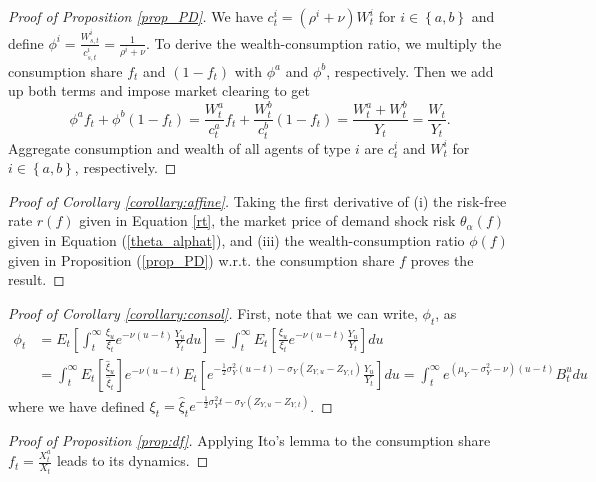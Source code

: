 \documentclass[preprint,11pt,authoryear]{elsarticle}
\theoremstyle{plain}
\begin{document}
\begin{proof}[Proof of Proposition \ref{prop_PD}]
We have $c^i_t = \left(\rho^i + \nu\right) W^i_t$ for $i \in \left\{a,b\right\}$ and define $\phi^i = \frac{W^i_{s,t}}{c^i_{s,t}} = \frac{1}{\rho^i + \nu}$. To derive the wealth-consumption ratio, we multiply the consumption share $f_{t}$ and $(1-f_t)$ with $\phi^{a}$ and $\phi^{b}$, respectively. Then we add up both terms and impose market clearing to get
\begin{equation}
    \phi^{a} f_t + \phi^{b}\left(1-f_t\right) = \frac{W^a_t}{c^a_t}f_t + \frac{W^b_t}{c^b_t}\left(1-f_t\right) = \frac{W^a_t + W^b_t}{Y_t} = \frac{W_t}{Y_t}.
\end{equation}
Aggregate consumption and wealth of all agents of type $i$ are $c^i_t$ and $W^i_t$ for $i \in \left\{a,b\right\}$, respectively.
\end{proof}
\begin{proof}[Proof of Corollary \ref{corollary:affine}]
Taking the first derivative of (i) the risk-free rate $r(f)$ given in Equation \ref{rt}, the market price of demand shock risk $\theta_{\alpha}(f)$ given in Equation (\ref{theta_alphat}), and (iii) the wealth-consumption ratio $\phi(f)$ given in Proposition (\ref{prop_PD}) w.r.t. the consumption share $f$ proves the result. 
\end{proof}
\begin{proof}[Proof of Corollary \ref{corollary:consol}]
First, note that we can write, $\phi_t$, as 
\begin{equation}
    \begin{split}
    \phi_t &=  E_t\left[\int_{t}^{\infty} \frac{\xi_{u}}{\xi_t}e^{-\nu\left(u-t\right)}\frac{Y_u}{Y_t}du\right]  
     =  \int_{t}^{\infty} E_t\left[\frac{\xi_{u}}{\xi_t}e^{-\nu\left(u-t\right)}\frac{Y_u}{Y_t}\right]du \\
    &=  \int_{t}^{\infty} E_t\left[\frac{\hat{\xi}_{u}}{\hat{\xi}_t}\right]e^{-\nu\left(u-t\right)}E_t\left[e^{-\frac{1}{2}\sigma_Y^2\left(u-t\right) - \sigma_Y \left(Z_{Y,u} - Z_{Y,t}\right)}\frac{Y_u}{Y_t}\right]du    
     =  \int_{t}^{\infty}  e^{(\mu_Y - \sigma_Y^2 - \nu) (u-t)} B^u_{t}du
\end{split}
\end{equation}
where we have defined $\xi_t = \hat{\xi}_{t} e^{-\frac{1}{2}\sigma_Y^2 t - \sigma_Y \left(Z_{Y,u} - Z_{Y,t}\right)}$.
\end{proof}
 \begin{proof}[Proof of Proposition \ref{prop:df}]
 Applying Ito's lemma to the consumption share $f_t = \frac{X^a_t}{X_t}$ leads to its dynamics.
 \end{proof}
\end{document}
